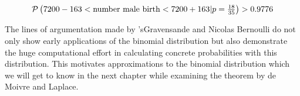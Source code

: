 \begin{align}
    \P{7200-163 < \text{number male birth} < 7200+163|p=\tfrac{18}{35}} > 0.9776
\end{align}

The lines of argumentation made by 'sGravensande and Nicolas Bernoulli do not only show early applications of the binomial distribution but also demonstrate the huge computational effort in calculating concrete probabilities with this distribution. This motivates approximations to the binomial distribution which we will get to know in the next chapter while examining the theorem by de Moivre and Laplace.
